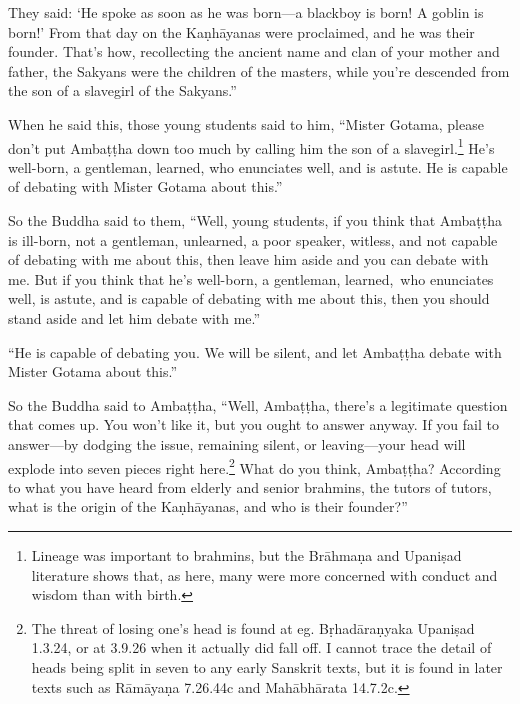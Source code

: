 \documentclass[12pt,openany]{book}%
\begin{document}
They said: ‘He spoke as soon as he was born—a blackboy is born! A goblin is born!’ From that day on the \textsanskrit{Kaṇhāyanas} were proclaimed, and he was their founder. That’s how, recollecting the ancient name and clan of your mother and father, the Sakyans were the children of the masters, while you’re descended from the son of a slavegirl of the Sakyans.” 

When he said this, those young students said to him, “Mister Gotama, please don’t put \textsanskrit{Ambaṭṭha} down too much by calling him the son of a slavegirl.\footnote{Lineage was important to brahmins, but the \textsanskrit{Brāhmaṇa} and \textsanskrit{Upaniṣad} literature shows that, as here, many were more concerned with conduct and wisdom than with birth. } He’s well-born, a gentleman, learned, who enunciates well, and is astute. He is capable of debating with Mister Gotama about this.” 

So the Buddha said to them, “Well, young students, if you think that \textsanskrit{Ambaṭṭha} is ill-born, not a gentleman, unlearned, a poor speaker, witless, and not capable of debating with me about this, then leave him aside and you can debate with me. But if you think that he’s well-born, a gentleman, learned, who enunciates well, is astute, and is capable of debating with me about this, then you should stand aside and let him debate with me.” 

“He is capable of debating you. We will be silent, and let \textsanskrit{Ambaṭṭha} debate with Mister Gotama about this.” 

So the Buddha said to \textsanskrit{Ambaṭṭha}, “Well, \textsanskrit{Ambaṭṭha}, there’s a legitimate question that comes up. You won’t like it, but you ought to answer anyway. If you fail to answer—by dodging the issue, remaining silent, or leaving—your head will explode into seven pieces right here.\footnote{The threat of losing one’s head is found at eg. \textsanskrit{Bṛhadāraṇyaka} \textsanskrit{Upaniṣad} 1.3.24, or at 3.9.26 when it actually did fall off. I cannot trace the detail of heads being split in seven to any early Sanskrit texts, but it is found in later texts such as \textsanskrit{Rāmāyaṇa} 7.26.44c and \textsanskrit{Mahābhārata} 14.7.2c. } What do you think, \textsanskrit{Ambaṭṭha}? According to what you have heard from elderly and senior brahmins, the tutors of tutors, what is the origin of the \textsanskrit{Kaṇhāyanas}, and who is their founder?” 
\end{document}
